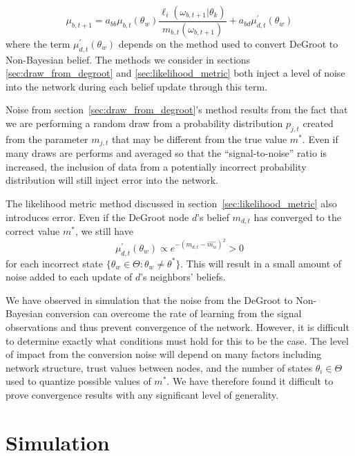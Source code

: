 \documentclass[letterpaper, 10pt, conference]{ieeeconf}
\begin{document}
\begin{equation}
\mu_{b,t+1} = a_{bb}\mu_{b,t}(\theta_w)\frac{\ell_i(\omega_{b,t+1}|\theta_k)}{m_{b,t}(\omega_{b,t+1})} + a_{bd}\mu_{d,t}^\prime(\theta_w)
\end{equation}
where the term $\mu_{d,t}^\prime(\theta_w)$ depends on the method used to convert DeGroot to Non-Bayesian belief.  The methods we consider in sections \ref{sec:draw_from_degroot} and \ref{sec:likelihood_metric} both inject a level of noise into the network during each belief update through this term.

Noise from section~\ref{sec:draw_from_degroot}'s method results from the fact that we are performing a random draw from a probability distribution $p_{j,t}$ created from the parameter $m_{j,t}$ that may be different from the true value $m^*$.  Even if many draws are performs and averaged so that the ``signal-to-noise'' ratio is increased, the inclusion of data from a potentially incorrect probability distribution will still inject error into the network.

The likelihood metric method discussed in section~\ref{sec:likelihood_metric} also introduces error.  Even if the DeGroot node $d$'s belief $m_{d,t}$ has converged to the correct value $m^*$, we still have
\begin{equation}
\mu_{d,t}^\prime(\theta_w) \propto e^{-(m_{d,t} - \hat{m_w})^2} > 0
\end{equation}
for each incorrect state $\{ \theta_w \in \Theta : \theta_w \neq \theta^* \}$.  This will result in a small amount of noise added to each update of $d$'s neighbors' beliefs.

We have observed in simulation that the noise from the DeGroot to Non-Bayesian conversion can overcome the rate of learning from the signal observations and thus prevent convergence of the network.  However, it is difficult to determine exactly what conditions must hold for this to be the case.  The level of impact from the conversion noise will depend on many factors including network structure, trust values between nodes, and the number of states $\theta_i \in \Theta$ used to quantize possible values of $m^*$.  We have therefore found it difficult to prove convergence results with any significant level of generality.

\section{Simulation}
\label{sec:simulation}
\end{document}
